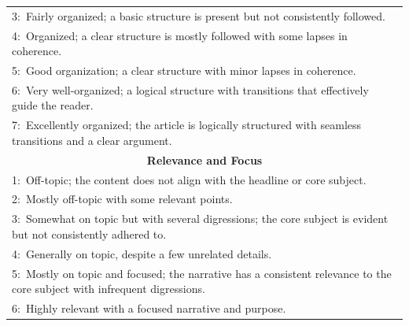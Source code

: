 \begin{table}
{\begin{tabular}{l}
3:~Fairly organized; a basic structure is present but not consistently followed.                                                                                                             \\
4:~Organized; a clear structure is mostly followed with some lapses in coherence.                                                                                                            \\
5:~Good organization; a clear structure with minor lapses in coherence.                                                                                                                      \\
6:~Very well-organized; a logical structure with transitions that effectively guide the reader.                                                                                              \\
7:~Excellently organized; the article is logically structured with seamless transitions and a clear argument.                                                                                \\ 
\midrule
\multicolumn{1}{c}{\textbf{Relevance and Focus}}                                                                                                                                             \\ 
\midrule
1:~Off-topic; the content does not align with the headline or core subject.                                                                                                                  \\
2:~Mostly off-topic with some relevant points.                                                                                                                                               \\
3:~Somewhat on topic but with several digressions; the core subject is evident but not consistently adhered to.                                                                              \\
4:~Generally on topic, despite a few unrelated details.                                                                                                                                      \\
5:~Mostly on topic and focused; the narrative has a consistent relevance to the core subject with infrequent digressions.                                                                    \\
6:~Highly relevant with a focused narrative and purpose.                                                                                                                                     \\

\end{tabular}}
\end{table}
